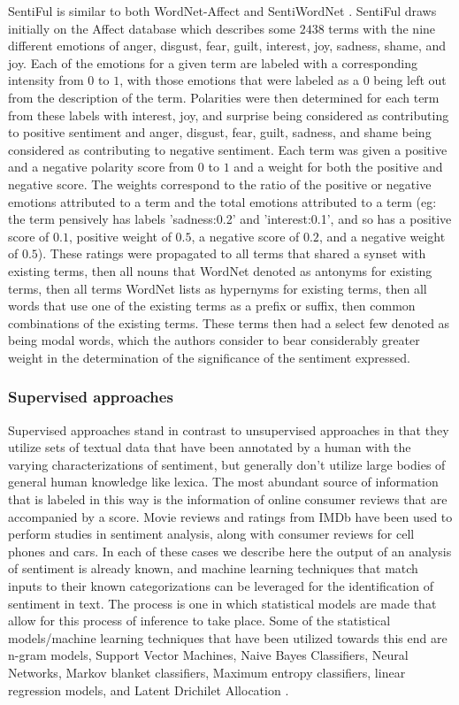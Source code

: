 \documentclass[letterpaper, 10 pt, conference]{ieeeconf}
\begin{document}
SentiFul is similar to both WordNet-Affect and SentiWordNet \textcolor{gray}{\cite{Neviarouskaya}}. SentiFul draws initially on the Affect database which describes some $2438$ terms with the nine different emotions of anger, disgust, fear, guilt, interest, joy, sadness, shame, and joy. Each of the emotions for a given term are labeled with a corresponding intensity from $0$ to $1$, with those emotions that were labeled as a $0$ being left out from the description of the term. Polarities were then determined for each term from these labels with interest, joy, and surprise being considered as contributing to positive sentiment and anger, disgust, fear, guilt, sadness, and shame being considered as contributing to negative sentiment. Each term was given a positive and a negative polarity score from $0$ to $1$ and a weight for both the positive and negative score. The weights correspond to the ratio of the positive or negative emotions attributed to a term and the total emotions attributed to a term (eg: the term pensively has labels 'sadness:0.2' and 'interest:0.1', and so has a positive score of $0.1$,  positive weight of $0.5$, a negative score of $0.2$, and a negative weight of $0.5$). These ratings were propagated to all terms that shared a synset with existing terms, then all nouns that WordNet denoted as antonyms for existing terms, then all terms WordNet lists as hypernyms for existing terms, then all words that use one of the existing terms as a prefix or suffix, then common combinations of the existing terms. These terms then had a select few denoted as being modal words, which the authors consider to bear considerably greater weight in the determination of the significance of the sentiment expressed.

\subsubsection{Supervised approaches}
Supervised approaches stand in contrast to unsupervised approaches in that they utilize sets of textual data that have been annotated by a human with the varying characterizations of sentiment, but generally don't utilize large bodies of general human knowledge like lexica. The most abundant source of information that is labeled in this way is the information of online consumer reviews that are accompanied by a score. Movie reviews and ratings from IMDb have been used to perform studies in sentiment analysis, along with consumer reviews for cell phones and cars. In each of these cases we describe here the output of an analysis of sentiment is already known, and machine learning techniques that match inputs to their known categorizations can be leveraged for the identification of sentiment in text. The process is one in which statistical models are made that allow for this process of inference to take place. Some of the statistical models/machine learning techniques that have been utilized towards this end are n-gram models, Support Vector Machines, Naive Bayes Classifiers, Neural Networks, Markov blanket classifiers, Maximum entropy classifiers, linear regression models, and Latent Drichilet Allocation \textcolor{gray}{\cite{RaviRavi}}.
\end{document}
